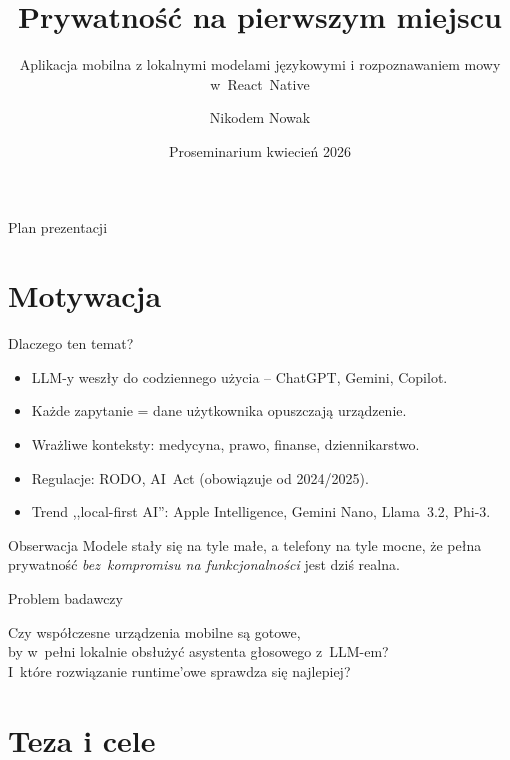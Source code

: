 \documentclass[aspectratio=169,11pt]{beamer}
\title{Prywatność na pierwszym miejscu}
\subtitle{Aplikacja mobilna z lokalnymi modelami językowymi i rozpoznawaniem mowy w~React~Native}
\author{Nikodem Nowak}
\institute{Wydział ... \\ Kierunek ...}
\date{Proseminarium \textbullet{} kwiecień 2026}
\begin{document}
\begin{frame}[plain]
  \titlepage
\end{frame}

\begin{frame}{Plan prezentacji}
  \tableofcontents
\end{frame}

\section{Motywacja}

\begin{frame}{Dlaczego ten temat?}
  \begin{itemize}
    \item LLM-y weszły do codziennego użycia -- ChatGPT, Gemini, Copilot.
    \item Każde zapytanie = dane użytkownika opuszczają urządzenie.
    \item Wrażliwe konteksty: medycyna, prawo, finanse, dziennikarstwo.
    \item Regulacje: \alert{RODO}, \alert{AI~Act} (obowiązuje od 2024/2025).
    \item Trend ,,local-first AI'': Apple Intelligence, Gemini Nano, Llama~3.2, Phi-3.
  \end{itemize}
  \vfill
  \begin{alertblock}{Obserwacja}
    Modele stały się na tyle małe, a telefony na tyle mocne, że pełna prywatność \emph{bez~kompromisu na funkcjonalności} jest dziś realna.
  \end{alertblock}
\end{frame}

\begin{frame}{Problem badawczy}
  \begin{center}
    \Large
    Czy współczesne urządzenia mobilne są gotowe,\\
    by w~pełni \alert{lokalnie} obsłużyć asystenta głosowego z~LLM-em?\\[1em]
    \normalsize
    I~które rozwiązanie runtime'owe sprawdza się najlepiej?
  \end{center}
\end{frame}

\section{Teza i cele}
\end{document}
